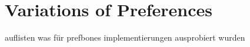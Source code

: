 \section{Variations of Preferences}

auflisten was für prefbones implementierungen ausprobiert wurden